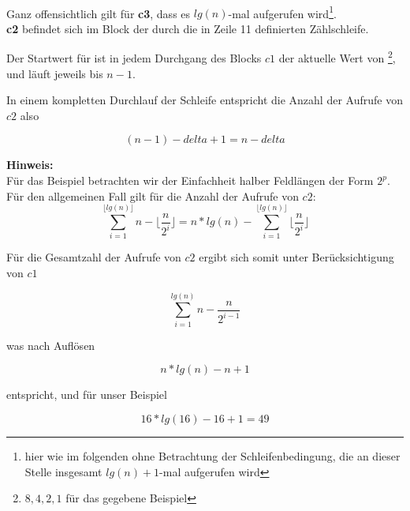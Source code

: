 \\

Ganz offensichtlich gilt für \textbf{c3}, dass es $lg(n)$-mal aufgerufen wird\footnote{hier wie im folgenden ohne Betrachtung der Schleifenbedingung, die an dieser Stelle insgesamt $lg(n) + 1$-mal aufgerufen wird}.
\\

\textbf{c2} befindet sich im Block der durch die in Zeile 11 definierten Zählschleife.

Der Startwert für  ist in jedem Durchgang des Blocks $c1$ der aktuelle Wert von \footnote{${8, 4, 2, 1}$ für das gegebene Beispiel}, und läuft jeweils bis $n - 1$.

In einem kompletten Durchlauf der Schleife entspricht die Anzahl der Aufrufe von $c2$ also

\begin{equation}
(n - 1) - delta + 1 = n - delta
\end{equation}

\begin{tcolorbox}
    \textbf{Hinweis:}
    \\
    Für das Beispiel betrachten wir der Einfachheit halber Feldlängen der Form $2^p$.
    \\
    Für den allgemeinen Fall gilt für die Anzahl der Aufrufe von $c2$:\\

    \begin{equation}
        \nonumber
        \sum_{i=1}^{\lfloor lg(n) \rfloor} n - \lfloor \frac{n}{2^i} \rfloor = n * lg(n) - \sum_{i=1}^{\lfloor lg(n) \rfloor} \lfloor \frac{n}{2^i} \rfloor
    \end{equation}
\end{tcolorbox}

Für die  Gesamtzahl der Aufrufe von $c2$ ergibt sich somit unter Berücksichtigung von $c1$

\begin{equation}
\sum_{i=1}^{lg(n)} n - \frac{n}{2^{i-1}}
\end{equation}

was nach Auflösen

\begin{equation}
    n * lg(n) - n + 1
\end{equation}

entspricht, und für unser Beispiel

\begin{equation}
    16 * lg(16) - 16 + 1 = 49
\end{equation}

